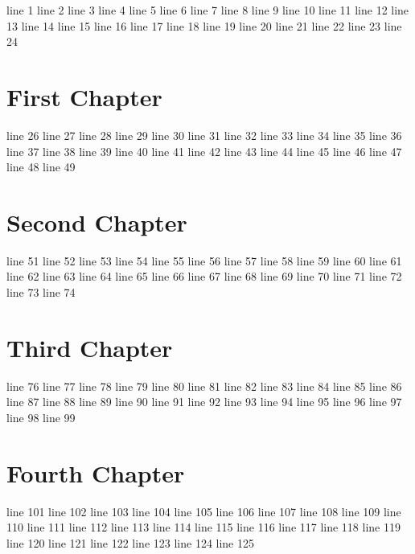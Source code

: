 line 1
line 2
line 3
line 4
line 5
line 6
line 7
line 8
line 9
line 10
line 11
line 12
line 13
line 14
line 15
line 16
line 17
line 18
line 19
line 20
line 21
line 22
line 23
line 24
\chapter{First Chapter}
line 26
line 27
line 28
line 29
line 30
line 31
line 32
line 33
line 34
line 35
line 36
line 37
line 38
line 39
line 40
line 41
line 42
line 43
line 44
line 45
line 46
line 47
line 48
line 49
\chapter{Second Chapter}
line 51
line 52
line 53
line 54
line 55
line 56
line 57
line 58
line 59
line 60
line 61
line 62
line 63
line 64
line 65
line 66
line 67
line 68
line 69
line 70
line 71
line 72
line 73
line 74
\chapter{Third Chapter}
line 76
line 77
line 78
line 79
line 80
line 81
line 82
line 83
line 84
line 85
line 86
line 87
line 88
line 89
line 90
line 91
line 92
line 93
line 94
line 95
line 96
line 97
line 98
line 99
\chapter{Fourth Chapter}
line 101
line 102
line 103
line 104
line 105
line 106
line 107
line 108
line 109
line 110
line 111
line 112
line 113
line 114
line 115
line 116
line 117
line 118
line 119
line 120
line 121
line 122
line 123
line 124
line 125